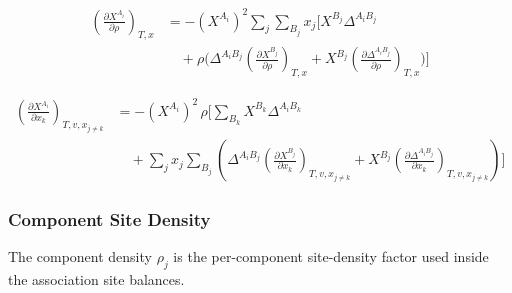 \documentclass[12pt, letterpaper]{article}
\begin{document}
\begin{equation}
    \begin{aligned}
        \left(\frac{\partial X^{A_{i}}}{\partial\rho}\right)_{T,x}
        &=-(X^{A_{i}})^{2}\sum_{j}\sum_{B_{j}}x_{j}
        \Bigg[
        X^{B_{j}}\Delta^{A_{i}B_{j}}
        \\
        &\quad +\rho\Bigg(
        \Delta^{A_{i}B_{j}}\left(\frac{\partial X^{B_{j}}}{\partial\rho}\right)_{T,x}
        +X^{B_{j}}\left(\frac{\partial\Delta^{A_{i}B_{j}}}{\partial\rho}\right)_{T,x}
        \Bigg)
        \Bigg]
    \end{aligned}
    \label{eq:dx_assoc_drho}
\end{equation}


\begin{equation}
    \begin{aligned}
        \left(\frac{\partial X^{A_{i}}}{\partial x_{k}}\right)_{T,v,x_{j\neq k}}
        &=
        -(X^{A_{i}})^{2}\,\rho
        \Bigg[
        \sum_{B_{k}}X^{B_{k}}\Delta^{A_{i}B_{k}}
        \\
        &\quad +
        \sum_{j}x_{j}\sum_{B_{j}}
        \left(
        \Delta^{A_{i}B_{j}}\left(\frac{\partial X^{B_{j}}}{\partial x_{k}}\right)_{T,v,x_{j\neq k}}
        +
        X^{B_{j}}\left(\frac{\partial \Delta^{A_{i}B_{j}}}{\partial x_{k}}\right)_{T,v,x_{j\neq k}}
        \right)
        \Bigg]
    \end{aligned}
    \label{eq:dx_assoc_dxk}
\end{equation}

\subsubsection{Component Site Density}

The component density \(\rho_j\) is the per-component site-density factor used inside the association site balances.
\end{document}

